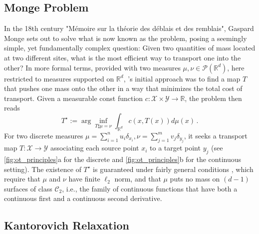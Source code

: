 \subsection{Monge Problem} \label{sec:background_monge}

In the 18th century "M{\'e}moire sur la th{\'e}orie des d{\'e}blais et des remblais", Gaspard Monge sets out to solve what is now known as the \citeauthor{monge1781histoire} problem, posing a seemingly simple, yet fundamentally complex question: Given two quantities of mass located at two different sites, what is the most efficient way to transport one into the other?
In more formal terms, provided with two measures $\mu, \nu\in \mathcal{P}(\mathbb{R}^d)$, here restricted to measures supported on $\mathbb{R}^d$, \citeauthor{monge1781histoire}'s initial approach was to find a map $T$ that pushes one mass onto the other in a way that minimizes the total cost of transport.
Given a measurable const function $c: \mathcal{X} \times \mathcal{Y} \rightarrow \mathbb{R}$, the \citeauthor{monge1781histoire} problem then reads
\begin{equation}\label{eq:monge}
T^\star := \arg\inf_{T\sharp\mu=\nu}\int_{\mathbb{R}^d} c(x, T(x)) d\mu(x)\,.
\end{equation}
For two discrete measures $\mu=\sum_{i=1}^n u_i \delta_{x_{i}}, \nu=\sum_{j=1}^m v_j \delta_{y_{j}}$, it seeks a transport map $T: \mathcal{X} \rightarrow \mathcal{Y}$ associating each source point $x_i$ to a target point $y_j$ (see \cref{fig:ot_principles}a for the discrete and \cref{fig:ot_principles}b for the continuous setting).
The existence of $T^\star$ is guaranteed under fairly general conditions \citep[Theorem 1.22]{santambrogio2015optimal}, which require that $\mu$ and $\nu$ have finite $\ell_2$ norm, and that $\mu$ puts no mass on $(d-1)$ surfaces of class $\mathcal{C}_2$, 
i.e., the family of continuous functions that have both a continuous first and a continuous second derivative.


\subsection{Kantorovich Relaxation} \label{sec:background_kantorovich}

